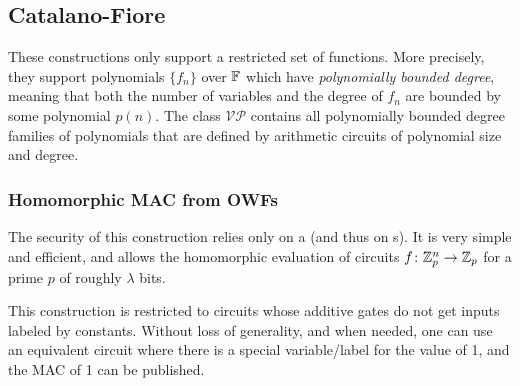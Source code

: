 \subsection{Catalano-Fiore}These constructions only support a restricted set of functions. More precisely,
they support polynomials $\{f_n\}$ over $\mathbb{F}$ which have \emph{polynomially
bounded degree}, meaning that both the number of variables and the degree of
$f_n$ are bounded by some polynomial $p(n)$. The class $\mathcal{VP}$ contains
all polynomially bounded degree families of polynomials that are defined by
arithmetic circuits of polynomial size and degree.

\subsubsection*{Homomorphic MAC from OWFs}
The security of this construction relies only on a  (and thus on s). It is very simple and
efficient, and allows the homomorphic evaluation of circuits
$\function{f}{\bbZ^n_p}{\bbZ_p}$ for a prime $p$ of roughly $\lambda$ bits.

This construction is restricted to circuits whose additive gates do not get
inputs labeled by constants. Without loss of generality, and when needed, one
can use an equivalent circuit where there is a special variable/label for the
value of 1, and the MAC of 1 can be published.

